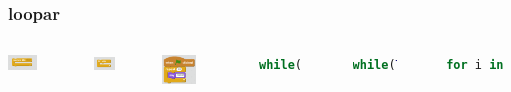 \documentclass{beamer}
\begin{document}
\begin{frame}[fragile]
	\frametitle{loopar}

	\begin{columns}[c] %
    	\begin{center}
     		\includegraphics[width=0.45\textwidth]{blocks/while.png}
     	\end{center}
     	\begin{center}
     	     \includegraphics[width=0.45\textwidth]{blocks/while_true.png}
     	\end{center}
     	\begin{center}
     	     \includegraphics[width=0.45\textwidth]{blocks/for_10.png}
     	\end{center}

		\begin{lstlisting}[language=Python]
			while():
    			#code
		\end{lstlisting}
		\
		
		\begin{lstlisting}[language=Python]
			while(True):
		    	#code
		\end{lstlisting}
		\
		
		\begin{lstlisting}[language=Python]
			for i in range(10):
			    print("Hello!")
		\end{lstlisting}
    \end{columns}
\end{frame}
\end{document}
